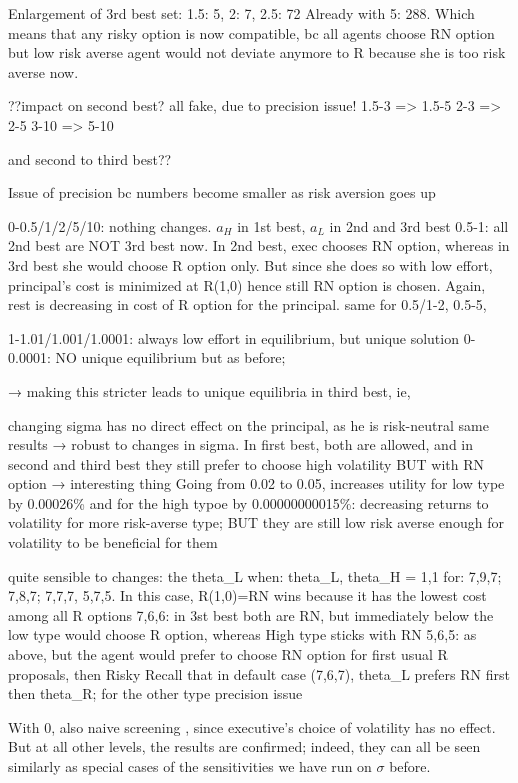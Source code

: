 Enlargement of 3rd best set: 1.5: 5, 2: 7, 2.5: 72
Already with 5: 288. Which means that any risky option is now compatible, bc all agents choose RN option but low risk averse agent would not deviate anymore to R because she is too risk averse now.


??impact on second best? all fake, due to precision issue!
1.5-3 => 1.5-5
2-3 => 2-5
3-10 => 5-10

and second to third best??

Issue of precision bc numbers become smaller as risk aversion goes up

0-0.5/1/2/5/10: nothing changes. $a_H$ in 1st best, $a_L$ in 2nd and 3rd best
0.5-1: all 2nd best are NOT 3rd best now. In 2nd best, exec chooses RN option, whereas in 3rd best she would choose R option only. But since she does so with low effort, principal's cost is minimized at R(1,0) hence still RN option is chosen. Again, rest is decreasing in cost of R option for the principal.
    same for 0.5/1-2, 0.5-5, 

1-1.01/1.001/1.0001: always low effort in equilibrium, but unique solution
0-0.0001: NO unique equilibrium but as before;  


→ making this stricter leads to unique equilibria in third best, ie, 


changing sigma has no direct effect on the principal, as he is risk-neutral
same results → robust to changes in sigma. In first best, both are allowed, and in second and third best they still prefer to choose high volatility BUT with RN option → interesting thing
Going from 0.02 to 0.05, increases utility for low type by 0.00026\% and for the high typoe by 0.00000000015\%: decreasing returns to volatility for more risk-averse type; BUT they are still low risk averse enough for volatility to be beneficial for them


quite sensible to changes: 
the
theta_L when: 
theta_L, theta_H = 1,1 for: 7,9,7; 7,8,7; 7,7,7, 5,7,5. In this case, R(1,0)=RN wins because it has the lowest cost among all R options
7,6,6: in 3st best both are RN, but immediately below the low type would choose R option, whereas High type sticks with RN 
5,6,5: as above, but the agent would prefer to choose RN option for first usual R proposals, then Risky
Recall that in default case (7,6,7), theta_L prefers RN first then theta_R; for the other type precision issue


With 0, also naive screening , since executive's choice of volatility has no effect. But at all other levels, the results are confirmed; indeed, they can all be seen similarly as special cases of the sensitivities we have run on $\sigma$ before.



